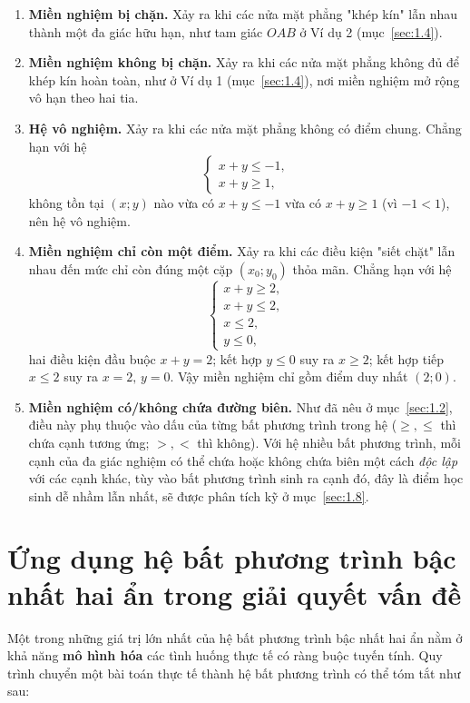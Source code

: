 \documentclass[12pt,a4paper]{report}
\begin{document}
\begin{enumerate}[label=(\arabic*)]
\item \textbf{Miền nghiệm bị chặn.} Xảy ra khi các nửa mặt phẳng "khép kín" lẫn nhau thành một đa giác hữu hạn, như tam giác $OAB$ ở Ví dụ 2 (mục~\ref{sec:1.4}).

\item \textbf{Miền nghiệm không bị chặn.} Xảy ra khi các nửa mặt phẳng không đủ để khép kín hoàn toàn, như ở Ví dụ 1 (mục~\ref{sec:1.4}), nơi miền nghiệm mở rộng vô hạn theo hai tia.

\item \textbf{Hệ vô nghiệm.} Xảy ra khi các nửa mặt phẳng không có điểm chung. Chẳng hạn với hệ
\[
\begin{cases}
x+y\le -1,\\
x+y\ge 1,
\end{cases}
\]
không tồn tại $(x;y)$ nào vừa có $x+y\le -1$ vừa có $x+y\ge 1$ (vì $-1<1$), nên hệ vô nghiệm.

\item \textbf{Miền nghiệm chỉ còn một điểm.} Xảy ra khi các điều kiện "siết chặt" lẫn nhau đến mức chỉ còn đúng một cặp $(x_0;y_0)$ thỏa mãn. Chẳng hạn với hệ
\[
\begin{cases}
x+y\ge 2,\\
x+y\le 2,\\
x\le 2,\\
y\le 0,
\end{cases}
\]
hai điều kiện đầu buộc $x+y=2$; kết hợp $y\le 0$ suy ra $x\ge 2$; kết hợp tiếp $x\le 2$ suy ra $x=2,\,y=0$. Vậy miền nghiệm chỉ gồm điểm duy nhất $(2;0)$.

\item \textbf{Miền nghiệm có/không chứa đường biên.} Như đã nêu ở mục~\ref{sec:1.2}, điều này phụ thuộc vào dấu của từng bất phương trình trong hệ ($\ge,\le$ thì chứa cạnh tương ứng; $>,<$ thì không). Với hệ nhiều bất phương trình, mỗi cạnh của đa giác nghiệm có thể chứa hoặc không chứa biên một cách \emph{độc lập} với các cạnh khác, tùy vào bất phương trình sinh ra cạnh đó, đây là điểm học sinh dễ nhầm lẫn nhất, sẽ được phân tích kỹ ở mục~\ref{sec:1.8}.
\end{enumerate}

\section{Ứng dụng hệ bất phương trình bậc nhất hai ẩn trong giải quyết vấn đề}
\label{sec:1.7}

Một trong những giá trị lớn nhất của hệ bất phương trình bậc nhất hai ẩn nằm ở khả năng \textbf{mô hình hóa} các tình huống thực tế có ràng buộc tuyến tính. Quy trình chuyển một bài toán thực tế thành hệ bất phương trình có thể tóm tắt như sau:
\end{document}
